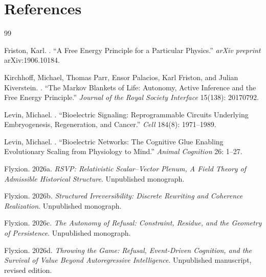 \documentclass[11pt]{article}
\theoremstyle{plain}
\begin{document}
\newpage
\section*{References}

{\renewcommand{\refname}{}
\begin{thebibliography}{99}

Friston, Karl.
.
\newblock ``A Free Energy Principle for a Particular Physics.''
\newblock \emph{arXiv preprint} arXiv:1906.10184.

Kirchhoff, Michael, Thomas Parr, Ensor Palacios, Karl Friston, and Julian Kiverstein.
.
\newblock ``The Markov Blankets of Life: Autonomy, Active Inference and the Free Energy Principle.''
\newblock \emph{Journal of the Royal Society Interface} 15(138): 20170792.

Levin, Michael.
.
\newblock ``Bioelectric Signaling: Reprogrammable Circuits Underlying Embryogenesis, Regeneration, and Cancer.''
\newblock \emph{Cell} 184(8): 1971--1989.

Levin, Michael.
.
\newblock ``Bioelectric Networks: The Cognitive Glue Enabling Evolutionary Scaling from Physiology to Mind.''
\newblock \emph{Animal Cognition} 26: 1--27.

Flyxion.
\newblock 2026a.
\newblock \emph{RSVP: Relativistic Scalar--Vector Plenum, A Field Theory of Admissible Historical Structure}.
\newblock Unpublished monograph.

Flyxion.
\newblock 2026b.
\newblock \emph{Structured Irreversibility: Discrete Rewriting and Coherence Realization}.
\newblock Unpublished monograph.

Flyxion.
\newblock 2026c.
\newblock \emph{The Autonomy of Refusal: Constraint, Residue, and the Geometry of Persistence}.
\newblock Unpublished monograph.

Flyxion.
\newblock 2026d.
\newblock \emph{Throwing the Game: Refusal, Event-Driven Cognition, and the Survival of Value Beyond Autoregressive Intelligence}.
\newblock Unpublished manuscript, revised edition.

\end{thebibliography}
}
\end{document}
